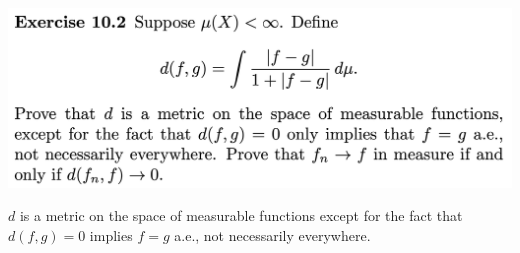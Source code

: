 

\newpage
\begin{mdframed}
\includegraphics[width=400pt]{img/analysis--berkeley-202a-hw09-b4e1.png}
\end{mdframed}

\begin{claim*}
  $d$ is a metric on the space of measurable functions except for the fact that $d(f, g) = 0$ implies $f = g$
  a.e., not necessarily everywhere.
\end{claim*}

